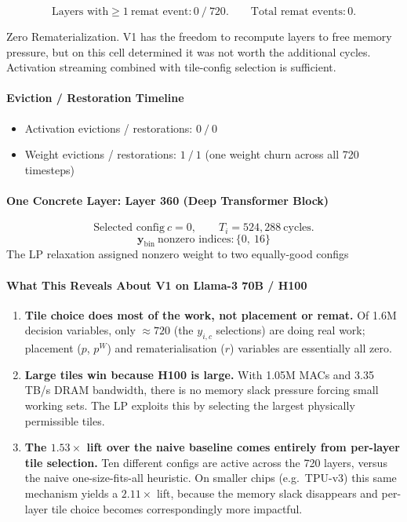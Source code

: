\[
    \text{Layers with} \geq 1\ \text{remat event}: 0\ /\ 720.
    \qquad
    \text{Total remat events}: 0.
\]

\noindent Zero Rematerialization. V1 has the freedom to recompute
layers to free memory pressure, but on this cell determined it was
not worth the additional cycles. Activation streaming combined with
tile-config selection is sufficient.

\paragraph{Eviction / Restoration Timeline}

\begin{itemize}[leftmargin=1.4em, itemsep=2pt]
    \item Activation evictions / restorations: $0\ /\ 0$
    \item Weight evictions / restorations: $1\ /\ 1$
          (one weight churn across all 720 timesteps)
\end{itemize}

\paragraph{One Concrete Layer: Layer 360 (Deep Transformer Block)}

\[
    \text{Selected config}\ c = 0, \qquad T_i = 524{,}288\ \text{cycles}.
\]
\[
    \mathbf{y}_{\mathrm{bin}}\ \text{nonzero indices}: \{0,\ 16\}
\]
The LP relaxation assigned nonzero weight to two equally-good configs

\paragraph{What This Reveals About V1 on Llama-3 70B / H100}

\begin{enumerate}

    \item \textbf{Tile choice does most of the work, not placement or remat.} Of 1.6M decision variables, only ${\approx}720$
          (the $y_{i,c}$ selections) are doing real work; placement
          ($p$, $p^W$) and rematerialisation ($r$) variables are
          essentially all zero.

    \item \textbf{Large tiles win because H100 is large.} With
          1.05M MACs and 3.35 TB/s DRAM bandwidth, there is no memory
          slack pressure forcing small working sets. The LP exploits
          this by selecting the largest physically permissible tiles.

    \item \textbf{The $1.53\times$ lift over the naive baseline comes
          entirely from per-layer tile selection.} Ten different configs
          are active across the 720 layers, versus the naive
          one-size-fits-all heuristic. On smaller chips (e.g.\ TPU-v3)
          this same mechanism yields a $2.11\times$ lift, because the
          memory slack disappears and per-layer tile choice becomes
          correspondingly more impactful.

\end{enumerate}


